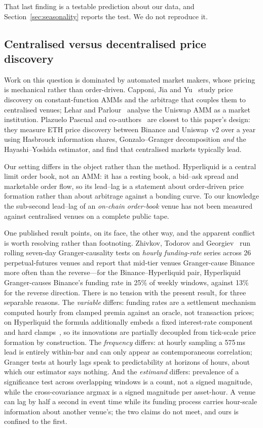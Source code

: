 \documentclass[11pt,a4paper]{article}
\begin{document}
That last finding is a testable prediction about our data, and Section~\ref{sec:seasonality}
reports the test. We do not reproduce it.

\subsection{Centralised versus decentralised price discovery}

Work on this question is dominated by automated market makers, whose pricing is mechanical rather
than order-driven. Capponi, Jia and Yu~\cite{capponi2022} study price discovery on
constant-function AMMs and the arbitrage that couples them to centralised venues; Lehar and
Parlour~\cite{lehar2025} analyse the Uniswap AMM as a market institution. Plazuelo Pascual and
co-authors~\cite{plazuelo2025} are closest to this paper's design: they measure ETH price
discovery between Binance and Uniswap~v2 over a year using Hasbrouck information shares,
Gonzalo--Granger decomposition \emph{and} the Hayashi--Yoshida estimator, and find that
centralised markets typically lead.

Our setting differs in the object rather than the method. Hyperliquid is a central limit order
book, not an AMM: it has a resting book, a bid--ask spread and marketable order flow, so its
lead--lag is a statement about order-driven price formation rather than about arbitrage against a
bonding curve. To our knowledge the sub-second lead--lag of an \emph{on-chain order-book} venue
has not been measured against centralised venues on a complete public tape.

One published result points, on its face, the other way, and the apparent conflict is worth
resolving rather than footnoting. Zhivkov, Todorov and Georgiev~\cite{zhivkov2026} run rolling
seven-day Granger-causality tests on \emph{hourly funding-rate} series across 26 perpetual-futures
venues and report that mid-tier venues Granger-cause Binance more often than the reverse---for the
Binance--Hyperliquid pair, Hyperliquid Granger-causes Binance's funding rate in 25\% of weekly
windows, against 13\% for the reverse direction. There
is no tension with the present result, for three separable reasons. The \emph{variable} differs:
funding rates are a settlement mechanism computed hourly from clamped premia against an oracle,
not transaction prices; on Hyperliquid the formula additionally embeds a fixed interest-rate
component and hard clamps~\cite{hyperliquid}, so its innovations are partially decoupled from
tick-scale price formation by construction. The \emph{frequency} differs: at hourly sampling a 575\,ms lead is entirely
within-bar and can only appear as contemporaneous correlation; Granger tests at hourly lags speak
to predictability at horizons of hours, about which our estimator says nothing. And the
\emph{estimand} differs: prevalence of a significance test across overlapping windows is a count,
not a signed magnitude, while the cross-covariance argmax is a signed magnitude per asset-hour.
A venue can lag by half a second in event time while its funding process carries hour-scale
information about another venue's; the two claims do not meet, and ours is confined to the first.
\end{document}
